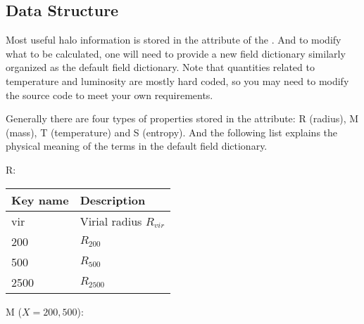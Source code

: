 \documentclass[letterpaper,10pt,english]{sphinxmanual}
\begin{document}
\subsection{Data Structure}
\label{\detokenize{Description:data-structure}}
Most useful halo information is stored in the 
attribute of the . And to modify what
to be calculated, one will need to provide a new field
dictionary similarly organized as the default field
dictionary. Note that quantities related to temperature
and luminosity are mostly hard coded, so you may need to
modify the source code to meet your own requirements.

Generally there are four types of properties stored in
the  attribute: R (radius), M (mass), T (temperature)
and S (entropy). And the following list explains the physical
meaning of the terms in the default field dictionary.

R:


\begin{savenotes}\sphinxattablestart
\centering
\begin{tabulary}{\linewidth}[t]{|T|T|}
\hline
\sphinxstyletheadfamily 
Key name
&\sphinxstyletheadfamily 
Description
\\
\hline
vir
&
Virial radius \(R_{vir}\)
\\
&
\(R_{200}\)
\\
&
\(R_{500}\)
\\
&
\(R_{2500}\)
\\
\hline
\end{tabulary}
\par
\sphinxattableend\end{savenotes}

M (\(X = 200, 500\)):
\end{document}

